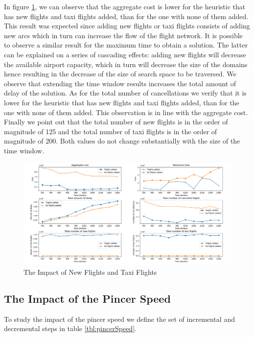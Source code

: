 In  figure \ref{fig:flightNoFlight}, we can observe that the aggregate cost is lower for the heuristic that has new flights and taxi flights added, than for the one with none of them added. This result was expected since adding new flights or taxi flights consists of adding new arcs which in turn can increase the flow of the flight network. It is possible to observe a similar result for the maximum time to obtain a solution. The latter can be explained on a series of cascading effects: adding new flights will decrease the available airport capacity, which in turn will decrease the size of the domains hence resulting in the decrease of the size of search space to be traversed. We  observe that extending the time window results increases the total amount of delay of the solution. As for the total number of cancellations we verify that it is lower for the heuristic that has new flights and taxi flights added, than for the one with none of them added. This observation is in line with the aggregate cost. Finally we point out that the total number of new flights is in the order of magnitude of 125 and the total number of taxi flights is in the order of magnitude of 200. Both values do not change substantially with the size of the time window.

	\begin{figure}[h!]
		\centering
		\includegraphics[width=\textwidth]{figures/flightNoFlight2x3.png}
		\caption[]{The Impact of New Flights and Taxi Flights}
		\label{fig:flightNoFlight}
	\end{figure}


\subsection{The Impact of the Pincer Speed}\label{sec:pincerSpeed}
To study the impact of the pincer speed we define the set of incremental and decremental steps in table \ref{tbl:pincerSpeed}.

